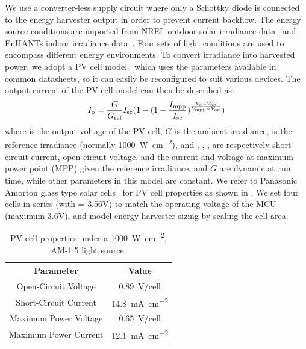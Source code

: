 We use a converter-less supply circuit where only a Schottky diode is connected to the energy harvester output in order to prevent current backflow. 
The energy source conditions are imported from NREL outdoor solar irradiance data~\cite{stoffel1981nrel} and EnHANTs indoor irradiance data~\cite{6244798}. 
Four sets of light conditions are used to encompass different energy environments. 
To convert irradiance into harvested power, we adopt a PV cell model~\cite{en9050326} which uses the parameters available in common datasheets, so it can easily be reconfigured to suit various devices. 
The output current  of the PV cell model can then be described as:
\begin{equation} \label{eq:pvcell}
    I_{\text{o}} = \frac{G}{G_{\text{ref}}} I_{\text{sc}} (1 - (1 - \frac{I_{\text{mpp}}}{I_{\text{sc}}}) ^ {\frac{V_{\text{o}}-V_{\text{oc}}}{V_{\text{mpp}} - V_{\text{oc}}}})
\end{equation}
where  is the output voltage of the PV cell, $G$ is the ambient irradiance,  is the reference irradiance (normally \SI{1000}{\watt\per\square\centi\meter}), and , , ,  are respectively short-circuit current, open-circuit voltage, and the current and voltage at maximum power point (MPP) given the reference irradiance. 
 and $G$ are dynamic at run time, while other parameters in this model are constant. 
We refer to Panasonic Amorton glass type solar cells~\cite{solarcell} for PV cell properties as shown in . 
We set four cells in series (with  = 3.56V) to match the operating voltage of the MCU (maximum 3.6V), and model energy harvester sizing by scaling the cell area. 



\begin{table}
    \renewcommand{\arraystretch}{1.2}
    \centering
    \begin{tabular}{|c|c|}
    \hline
    \textbf{Parameter} & \textbf{Value}\\
    \hline
    Open-Circuit Voltage & \SI{0.89}{\volt}/cell\\
    Short-Circuit Current & \SI{14.8}{\milli\ampere\per\square\centi\meter}\\
    Maximum Power Voltage & \SI{0.65}{\volt}/cell\\ 
    Maximum Power Current & \SI{12.1}{\milli\ampere\per\square\centi\meter}\\
    \hline
    \end{tabular}
    \caption{PV cell properties under a \SI{1000}{\watt\per\square\centi\meter}, AM-1.5 light source.}
    \label{tab:pvcell}
\end{table}

